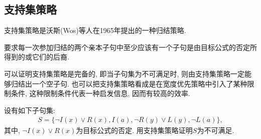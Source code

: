 \subsection{支持集策略}
 支持集策略是沃斯(Wos)等人在1965年提出的一种归结策略.
\begin{remark}
    要求每一次参加归结的两个亲本子句中至少应该有一个子句是由目标公式的否定所得到的或它们的后裔.
\end{remark}
 可以证明支持集策略是完备的, 即当子句集为不可满足时, 则由支持集策略一定能够归结出一个空子句.
 也可以把支持集策略看成是在宽度优先策略中引入了某种限制条件, 这种限制条件代表一种启发信息, 因而有较高的效率.
\begin{example}
设有如下子句集:
\begin{align}
    S=\{\neg I(x)\vee R(x),  I(a),\neg  R(y)\vee L(y), \neg L(a)\},
\end{align}
其中, $\neg I(x)\vee R(x)$为目标公式的否定. 用支持集策略证明$S$为不可满足.
\end{example}
